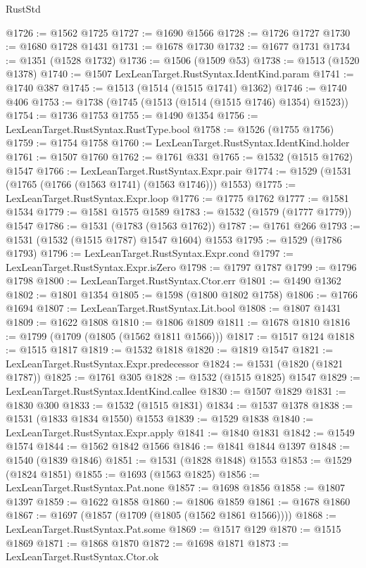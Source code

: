 \begin{lexlean}{RustStd}
\begin{coremodule}
@1726 := @1562 @1725
@1727 := @1690 @1566
@1728 := @1726 @1727
@1730 := @1680 @1728 @1431
@1731 := @1678 @1730
@1732 := @1677 @1731
@1734 := @1351 (@1528 @1732)
@1736 := @1506 (@1509 @53)
@1738 := @1513 (@1520 @1378)
@1740 := @1507 LexLeanTarget.RustSyntax.IdentKind.param
@1741 := @1740 @387
@1745 := @1513 (@1514 (@1515 @1741) @1362)
@1746 := @1740 @406
@1753 := @1738 (@1745 (@1513 (@1514 (@1515 @1746) @1354) @1523))
@1754 := @1736 @1753
@1755 := @1490 @1354
@1756 := LexLeanTarget.RustSyntax.RustType.bool
@1758 := @1526 (@1755 @1756)
@1759 := @1754 @1758
@1760 := LexLeanTarget.RustSyntax.IdentKind.holder
@1761 := @1507 @1760
@1762 := @1761 @331
@1765 := @1532 (@1515 @1762) @1547
@1766 := LexLeanTarget.RustSyntax.Expr.pair
@1774 := @1529 (@1531 (@1765 (@1766 (@1563 @1741) (@1563 @1746))) @1553)
@1775 := LexLeanTarget.RustSyntax.Expr.loop
@1776 := @1775 @1762
@1777 := @1581 @1534
@1779 := @1581 @1575 @1589
@1783 := @1532 (@1579 (@1777 @1779)) @1547
@1786 := @1531 (@1783 (@1563 @1762))
@1787 := @1761 @266
@1793 := @1531 (@1532 (@1515 @1787) @1547 @1604) @1553
@1795 := @1529 (@1786 @1793)
@1796 := LexLeanTarget.RustSyntax.Expr.cond
@1797 := LexLeanTarget.RustSyntax.Expr.isZero
@1798 := @1797 @1787
@1799 := @1796 @1798
@1800 := LexLeanTarget.RustSyntax.Ctor.err
@1801 := @1490 @1362
@1802 := @1801 @1354
@1805 := @1598 (@1800 @1802 @1758)
@1806 := @1766 @1694
@1807 := LexLeanTarget.RustSyntax.Lit.bool
@1808 := @1807 @1431
@1809 := @1622 @1808
@1810 := @1806 @1809
@1811 := @1678 @1810
@1816 := @1799 (@1709 (@1805 (@1562 @1811 @1566)))
@1817 := @1517 @124
@1818 := @1515 @1817
@1819 := @1532 @1818
@1820 := @1819 @1547
@1821 := LexLeanTarget.RustSyntax.Expr.predecessor
@1824 := @1531 (@1820 (@1821 @1787))
@1825 := @1761 @305
@1828 := @1532 (@1515 @1825) @1547
@1829 := LexLeanTarget.RustSyntax.IdentKind.callee
@1830 := @1507 @1829
@1831 := @1830 @300
@1833 := @1532 (@1515 @1831)
@1834 := @1537 @1378
@1838 := @1531 (@1833 @1834 @1550) @1553
@1839 := @1529 @1838
@1840 := LexLeanTarget.RustSyntax.Expr.apply
@1841 := @1840 @1831
@1842 := @1549 @1574
@1844 := @1562 @1842 @1566
@1846 := @1841 @1844 @1397
@1848 := @1540 (@1839 @1846)
@1851 := @1531 (@1828 @1848) @1553
@1853 := @1529 (@1824 @1851)
@1855 := @1693 (@1563 @1825)
@1856 := LexLeanTarget.RustSyntax.Pat.none
@1857 := @1698 @1856
@1858 := @1807 @1397
@1859 := @1622 @1858
@1860 := @1806 @1859
@1861 := @1678 @1860
@1867 := @1697 (@1857 (@1709 (@1805 (@1562 @1861 @1566))))
@1868 := LexLeanTarget.RustSyntax.Pat.some
@1869 := @1517 @129
@1870 := @1515 @1869
@1871 := @1868 @1870
@1872 := @1698 @1871
@1873 := LexLeanTarget.RustSyntax.Ctor.ok

\end{coremodule}
\end{lexlean}
